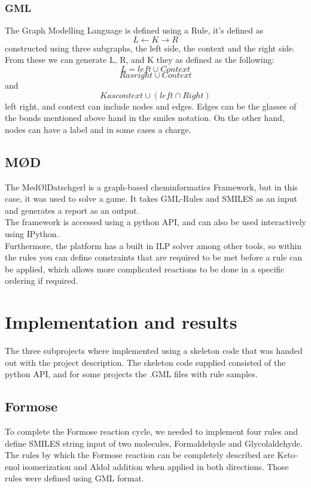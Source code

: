 \documentclass[a4paper,10pt,titlepage]{report}
\begin{document}
\subsubsection{GML}
The Graph Modelling Language\cite{http://www.fim.uni-passau.de/fileadmin/files/lehrstuhl/brandenburg/projekte/gml/gml-technical-report.pdf} is defined using a Rule, it's defined as
\begin{equation}
    L \longleftarrow K \longrightarrow R
\end{equation}
constructed using three subgraphs, the left side, the context and the right side. From these we can generate L, R, and K they as defined as the following:
\begin{equation}
    L = left \cup Context
\end{equation}
\begin{equation}
    R as right \cup Context
\end{equation}
and
\begin{equation}
    K as context \cup (left \cap Right)
\end{equation}
left right, and context can include nodes and edges. Edges can be the glasses of the bonds mentioned above hand in the smiles notation. On the other hand, nodes can have a label and in some cases a charge. 
\subsection{MØD}
The MedØlDatschgerl is a graph-based cheminformatics Framework, but in this case, it was used to solve a game.
It takes GML-Rules and SMILES as an input and generates a report as an output. \\
The framework is accessed using a python API, and can also be used interactively using IPython.
\\
Furthermore, the platform has a built in ILP solver among other tools, so within the rules you can define constraints that are required to be met before a rule can be applied, which allows more complicated reactions to be done in a specific ordering if required.
\newpage
\section{Implementation and results}

The three subprojects where implemented using a skeleton code that was handed out with the project description. The skeleton code supplied consisted of the python API, and for some projects the .GML files with rule samples.
\subsection{Formose}
To complete the Formose reaction cycle, we needed to implement four rules and define SMILES string input of two molecules, Formaldehyde and Glycolaldehyde. The rules by which the Formose reaction can be completely described are Keto-enol isomerization and Aldol addition when applied in both directions. Those rules were defined using GML format.
\end{document}
